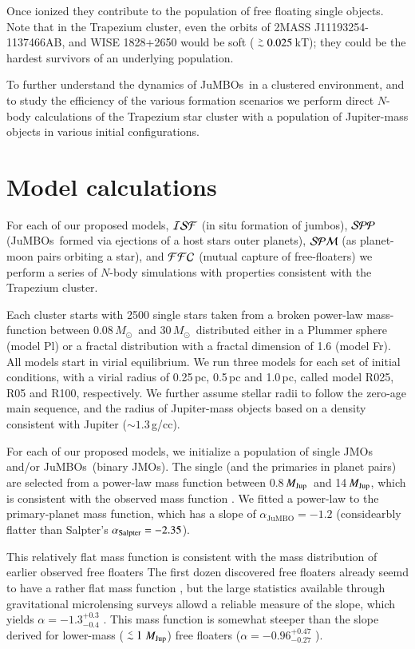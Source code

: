 \documentclass[submission,phys]{lib/SciPost}
\newcommand{\MSun}{\mbox{${M}_\odot$}}
\newcommand{\MJup}{\mbox{${M}_{\rm Jup}$}}
\def\apgt{\ {\raise-.5ex\hbox{$\buildrel>\over\sim$}}\ }
\def\aplt{\ {\raise-.5ex\hbox{$\buildrel<\over\sim$}}\ }
\newcommand{\jumbo}{\mbox{JuMBO}}
\newcommand{\jumbos}{\mbox{JuMBOs}}
\begin{document}
Once ionized they contribute to the population of free floating single
objects.  Note that in the Trapezium cluster, even the orbits of 2MASS
J11193254-1137466AB, and WISE 1828+2650 would be soft ($\apgt
0.025$\,kT); they could be the hardest survivors of an underlying
population.

To further understand the dynamics of \jumbos\, in a clustered
environment, and to study the efficiency of the various formation
scenarios we perform direct $N$-body calculations of the Trapezium
star cluster with a population of Jupiter-mass objects in various
initial configurations.

\section{Model calculations}\label{Sect:Model}

For each of our proposed models, ${\cal ISF}$ (in situ formation of
jumbos), ${\cal SPP}$ (\jumbos\, formed via ejections of a host stars
outer planets), ${\cal SPM}$ (as planet-moon pairs orbiting a star),
and ${\cal FFC}$ (mutual capture of free-floaters) we perform a
series of $N$-body simulations with properties consistent with the
Trapezium cluster.

Each cluster starts with 2500 single stars taken from a broken
power-law mass-function \cite{2002Sci...295...82K} between
$0.08$\,\MSun\, and $30$\,\MSun\, distributed either in a Plummer
sphere (model Pl) or a fractal distribution with a fractal dimension
of 1.6 (model Fr). All models start in virial equilibrium.  We run
three models for each set of initial conditions, with a virial radius
of 0.25\,pc, 0.5\,pc and 1.0\,pc, called model R025, R05 and R100,
respectively.  We further assume stellar radii to follow the zero-age
main sequence, and the radius of Jupiter-mass objects based on a
density consistent with Jupiter ($\sim 1.3$\,g/cc).

For each of our proposed models, we initialize a population of single
JMOs and/or \jumbos\, (binary JMOs). The single (and the primaries in
planet pairs) are selected from a power-law mass function between
0.8\,\MJup\, and 14\,\MJup, which is consistent with the observed mass
function \cite{2023arXiv231001231P}. We fitted a power-law to the
primary-planet mass function, which has a slope of $\alpha_{\jumbo}
=-1.2$ (considearbly flatter than Salpter's $\alpha_{\rm Salpter} =
-2.35$).

This relatively flat mass function is consistent with the mass
distribution of earlier observed free floaters The first dozen
discovered free floaters already seemd to have a rather flat mass
function \cite{2000MNRAS.314..858L}, but the large statistics
available through gravitational microlensing surveys allowd a reliable
measure of the slope, which yields $\alpha = -1.3^{+0.3}_{-0.4}$
\cite{2011Natur.473..349S}. This mass function is somewhat steeper
than the slope derived for lower-mass ($\aplt 1$\,\MJup) free floaters
($\alpha = -0.96^{+0.47}_{-0.27}$ \cite{2023AJ....166..108S}).
\end{document}
